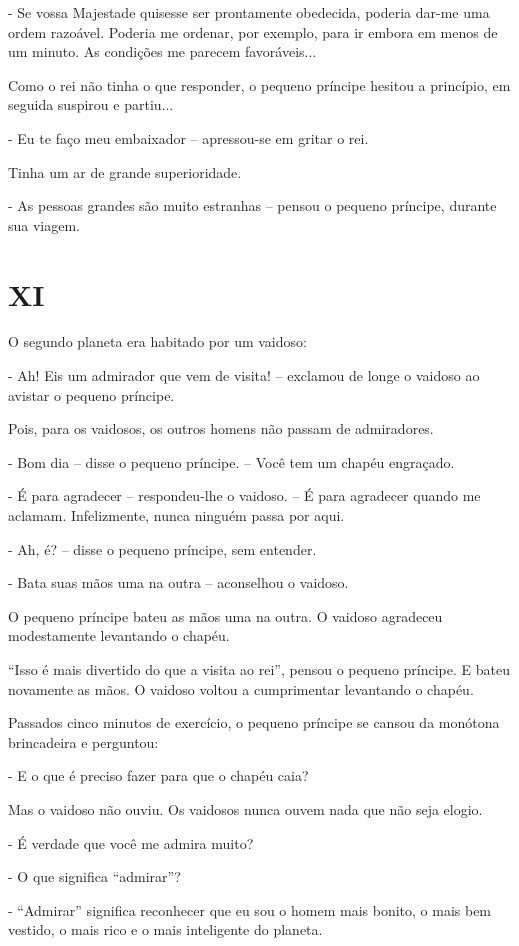 - Se vossa Majestade quisesse ser prontamente obedecida, poderia dar-me
uma ordem razoável. Poderia me ordenar, por exemplo, para ir embora em
menos de um minuto. As condições me parecem favoráveis...

Como o rei não tinha o que responder, o pequeno príncipe hesitou a
princípio, em seguida suspirou e partiu...

- Eu te faço meu embaixador -- apressou-se em gritar o rei.

Tinha um ar de grande superioridade.

- As pessoas grandes são muito estranhas -- pensou o pequeno príncipe,
durante sua viagem.

\chapter{XI}

O segundo planeta era habitado por um vaidoso:

- Ah! Eis um admirador que vem de visita! -- exclamou de longe o vaidoso
ao avistar o pequeno príncipe.

Pois, para os vaidosos, os outros homens não passam de admiradores.

- Bom dia -- disse o pequeno príncipe. -- Você tem um chapéu engraçado.

- É para agradecer -- respondeu-lhe o vaidoso. -- É para agradecer
quando me aclamam. Infelizmente, nunca ninguém passa por aqui.

- Ah, é? -- disse o pequeno príncipe, sem entender.

- Bata suas mãos uma na outra -- aconselhou o vaidoso.

O pequeno príncipe bateu as mãos uma na outra. O vaidoso agradeceu
modestamente levantando o chapéu.

``Isso é mais divertido do que a visita ao rei'', pensou o pequeno
príncipe. E bateu novamente as mãos. O vaidoso voltou a cumprimentar
levantando o chapéu.

Passados cinco minutos de exercício, o pequeno príncipe se cansou da
monótona brincadeira e perguntou:

- E o que é preciso fazer para que o chapéu caia?

Mas o vaidoso não ouviu. Os vaidosos nunca ouvem nada que não seja
elogio.

- É verdade que você me admira muito?

- O que significa ``admirar''?

- ``Admirar'' significa reconhecer que eu sou o homem mais bonito, o
mais bem vestido, o mais rico e o mais inteligente do planeta.

